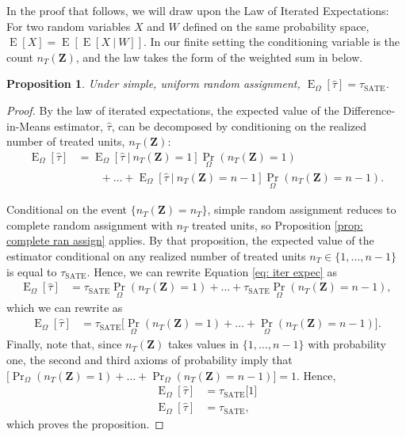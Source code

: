 \documentclass[12pt,leqno]{article}
\theoremstyle{newstyle}
\newtheorem{prop}[thm]{Proposition}
\newcommand{\given}[1][]{\:#1\vert\:}
\DeclareMathOperator{\E}{\mathrm{E}}
\DeclareMathOperator{\Var}{\mathrm{Var}}
\newcommand{\bZ}{\bm{Z}}   \newcommand{\bz}{\bm{z}}   %
\newcommand{\EZ}{\E_{\Omega}}    \newcommand{\VarZ}{\Var_{\Omega}}  %
\newcommand{\tauS}{\tau_{\text{SATE}}}
\newcommand{\tauhat}{\hat{\tau}}
\renewcommand{\Pr}{\operatorname{Pr}}
\begin{document}
In the proof that follows, we will draw upon the Law of Iterated Expectations: For two random variables $X$ and $W$ defined on the same probability space, $\E[X] = \E[\E[X \given W]]$. In our finite setting the conditioning variable is the count $n_T(\bZ)$, and the law takes the form of the weighted sum in  below. 

\begin{prop}
\label{prop: simple random assign}
Under simple, uniform random assignment, $\EZ [\tauhat] = \tauS$.
\end{prop}

\begin{proof}
By the law of iterated expectations, the expected value of the Difference-in-Means estimator, $\tauhat$, can be decomposed by conditioning on the realized number of treated units, $n_T(\bZ)$:
\begin{equation}
\label{eq: iter expec}
\begin{split}
\EZ\left[\tauhat\right] & = \EZ\left[\tauhat \given n_T(\bZ) = 1\right] \Pr_{\Omega}\left(n_T(\bZ) = 1\right) \\
& \qquad + \dots + \EZ\left[\tauhat \given n_T(\bZ) = n - 1\right]\Pr_{\Omega}\left(n_T(\bZ) = n - 1\right).
\end{split}
\end{equation}

Conditional on the event $\{n_T(\bZ) = n_T\}$, simple random assignment reduces to complete random assignment with $n_T$ treated units, so Proposition \ref{prop: complete ran assign} applies. By that proposition, the expected value of the estimator conditional on any realized number of treated units $n_T \in \{1, \dots, n - 1\}$ is equal to $\tauS$. Hence, we can rewrite Equation \eqref{eq: iter expec} as
\begin{align*}
\EZ\left[\tauhat\right] & = \tauS\Pr_{\Omega}\left(n_T(\bZ) = 1\right) + \dots + \tauS\Pr_{\Omega}\left(n_T(\bZ) = n - 1\right),
\end{align*}
which we can rewrite as
\begin{align*}
\EZ\left[\tauhat\right] & = \tauS\big[\Pr_{\Omega}\left(n_T(\bZ) = 1\right) + \dots + \Pr_{\Omega}\left(n_T(\bZ) = n - 1\right)\big].
\end{align*}
Finally, note that, since $n_T(\bZ)$ takes values in $\{1, \dots, n - 1\}$ with probability one, the second and third axioms of probability imply that $\big[\Pr_{\Omega}(n_T(\bZ) = 1) + \dots + \Pr_{\Omega}(n_T(\bZ) = n - 1)\big] = 1$. Hence,
\begin{align*}
\EZ\left[\tauhat\right] & = \tauS\big[1\big] \\ \EZ\left[\tauhat\right] & = \tauS,
\end{align*}
which proves the proposition.
\end{proof}
\end{document}
